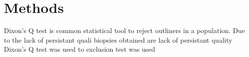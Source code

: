 \chapter{Methods}

Dixon's Q test is common statistical tool to reject outliners in a population. Due to the lack of persistant quali biopsies obtained are lack of persistant quality Dixon's Q test was used to   exclusion test was used 